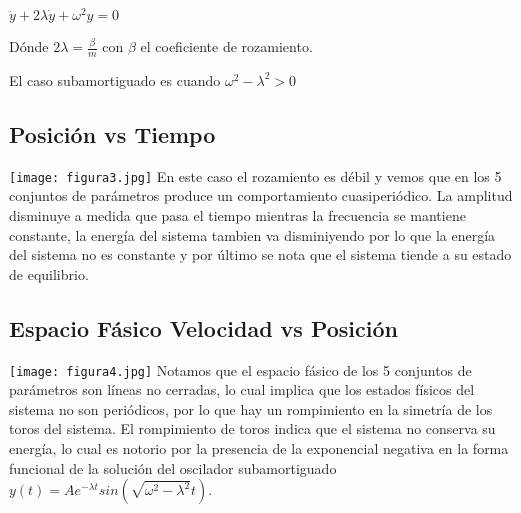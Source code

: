\documentclass{article}
\begin{document}
$\ddot{y}+2\lambda\dot{y}+\omega^2y=0$ 

Dónde $2\lambda=\frac{\beta}{m}$ con $\beta$ el coeficiente de rozamiento.

El caso subamortiguado es cuando $\omega^2 -\lambda^2>0$ 

\medskip
\subsection{Posición vs Tiempo}
\texttt{[image: figura3.jpg]}
\medskip
En este caso el rozamiento es débil y vemos que en los 5 conjuntos de parámetros produce un comportamiento cuasiperiódico. La amplitud disminuye a medida que pasa el tiempo mientras la frecuencia se mantiene constante, la energía del sistema tambien va disminiyendo por lo que la energía del sistema no es constante y por último se nota que el sistema tiende a su estado de equilibrio. 
\medskip
\subsection{Espacio Fásico Velocidad vs Posición}
\texttt{[image: figura4.jpg]}
\medskip
Notamos que el espacio fásico de los 5 conjuntos de parámetros son líneas no cerradas, lo cual implica que los estados físicos del sistema no son periódicos, por lo que hay un rompimiento en la simetría de los toros del sistema. El rompimiento de toros indica que el sistema no conserva su energía, lo cual es notorio por la presencia de la exponencial negativa en la forma funcional de la solución del oscilador subamortiguado $y(t)=Ae^{-\lambda t} sin(\sqrt{\omega^2-\lambda^2} t)$.
\medskip
\end{document}
